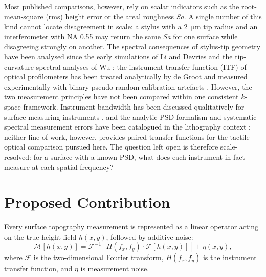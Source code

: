 \documentclass{imeko_wc}
\begin{document}
Most published comparisons, however, rely on scalar indicators such as the root-mean-square (rms) height error or the areal roughness \emph{Sa}. A single number of this kind cannot locate disagreement in scale: a stylus with a \qty{2}{\micro\metre} tip radius and an interferometer with NA 0.55 may return the same \emph{Sa} for one surface while disagreeing strongly on another. The spectral consequences of stylus-tip geometry have been analysed since the early simulations of Li and Devries \cite{li1984computer} and the tip-curvature spectral analyses of Wu \cite{wu1999spectral}; the instrument transfer function (ITF) of optical profilometers has been treated analytically by de Groot \cite{degroot2021itf} and measured experimentally with binary pseudo-random calibration artefacts \cite{yashchuk2015binary}. However, the two measurement principles have not been compared within one consistent $k$-space framework. Instrument bandwidth has been discussed qualitatively for surface measuring instruments \cite{leach2010bandwidth}, and the analytic PSD formalism and systematic spectral measurement errors have been catalogued in the lithography context \cite{mack2011analytic,mack2013systematic}; neither line of work, however, provides paired transfer functions for the tactile--optical comparison pursued here. The question left open is therefore scale-resolved: for a surface with a known PSD, what does each instrument in fact measure at each spatial frequency?

\section{Proposed Contribution}

\label{sec:contribution}
Every surface topography measurement is represented as a linear operator acting on the true height field $h(x,y)$, followed by additive noise:
\begin{equation}
\mathcal{M}[h(x,y)] = \mathcal{F}^{-1}\!\left[H(f_x,f_y)\cdot \mathcal{F}[h(x,y)]\right] + \eta(x,y),
\end{equation}
where $\mathcal{F}$ is the two-dimensional Fourier transform, $H(f_x,f_y)$ is the instrument transfer function, and $\eta$ is measurement noise.
\end{document}
